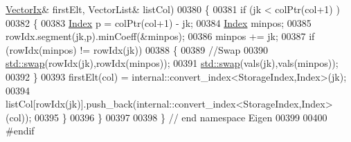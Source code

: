 \begin{DoxyCode}
      \hyperlink{group___core___module}{VectorIx}& firstElt, VectorList& listCol)
00380 \{
00381   \textcolor{keywordflow}{if} (jk < colPtr(col+1) )
00382   \{
00383     \hyperlink{namespace_eigen_a62e77e0933482dafde8fe197d9a2cfde}{Index} p = colPtr(col+1) - jk;
00384     \hyperlink{namespace_eigen_a62e77e0933482dafde8fe197d9a2cfde}{Index} minpos; 
00385     rowIdx.segment(jk,p).minCoeff(&minpos);
00386     minpos += jk;
00387     \textcolor{keywordflow}{if} (rowIdx(minpos) != rowIdx(jk))
00388     \{
00389       \textcolor{comment}{//Swap}
00390       \hyperlink{endian_8c_a3ca5ecd34b04d6a243c054ac3a57f68d}{std::swap}(rowIdx(jk),rowIdx(minpos));
00391       \hyperlink{endian_8c_a3ca5ecd34b04d6a243c054ac3a57f68d}{std::swap}(vals(jk),vals(minpos));
00392     \}
00393     firstElt(col) = internal::convert\_index<StorageIndex,Index>(jk);
00394     listCol[rowIdx(jk)].push\_back(internal::convert\_index<StorageIndex,Index>(col));
00395   \}
00396 \}
00397 
00398 \} \textcolor{comment}{// end namespace Eigen }
00399 
00400 \textcolor{preprocessor}{#endif}
\end{DoxyCode}
